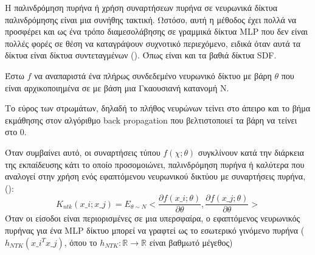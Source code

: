     H παλινδρόμηση πυρήνα ή χρήση συναρτήσεων πυρήνα σε νευρωνικά δίκτυα παλινδρόμησης είναι μια συνήθης τακτική. Ωστόσο, αυτή η μέθοδος έχει πολλά να προσφέρει και ως ένα τρόπο διαμεσολάβησης σε γραμμικά δίκτυα MLP που δεν είναι πολλές φορές σε θέση να καταγράψουν συχνοτικό περιεχόμενο, ειδικά όταν αυτά τα δίκτυα είναι δίκτυα συντεταγμένων (). Όπως είναι και τα βαθιά δίκτυα SDF.  

    Έστω $f$ να αναπαριστά ένα πλήρως συνδεδεμένο νευρωνικό δίκτυο με βάρη $\theta$ που είναι αρχικοποιημένα σε με βάση μια Γκαουσιανή κατανομή Ν.  

    Το εύρος των στρωμάτων, δηλαδή το πλήθος νευρώνων τείνει στο άπειρο και το βήμα εκμάθησης στον αλγόριθμο back propagation που βελτιστοποιεί τα βάρη να τείνει στο 0. 

    Όταν συμβαίνει αυτό, οι  συναρτήσεις τύπου $f(\chi;\theta)$  συγκλίνουν κατά την διάρκεια της εκπαίδευσης κάτι το οποίο προσομοιώνει, παλινδρόμηση πυρήνα ή καλύτερα  που αναλογεί στην χρήση ενός εφαπτόμενου νευρωνικού δικτύου με συναρτήσεις πυρήνα, (): $$ K_{ntk}(x\_i;x\_j) = E_{\theta \sim N}<\frac{\partial{f(x\_i;\theta)}}{\partial{\theta}},\frac{\partial{f(x\_j;\theta)}}{\partial{\theta}}>$$
    Όταν οι είσοδοι είναι περιορισμένες σε μια υπερσφαίρα, ο εφαπτόμενος νευρωνικός πυρήνας για ένα MLP δίκτυο μπορεί να γραφτεί ως το εσωτερικό γινόμενο πυρήνα ($h_{NTK}(x\_i^{T}x\_j)$, όπου το $h_{NTK}:\mathbb{R}\rightarrow\mathbb{R}$ είναι βαθμωτό μέγεθος)


